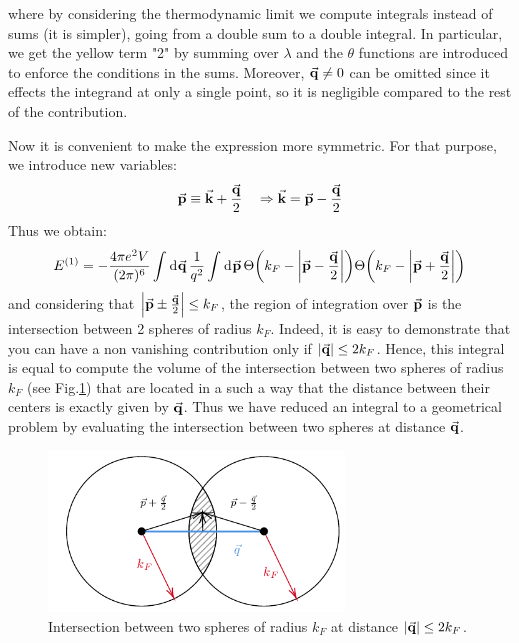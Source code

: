 \documentclass[../main/main.tex]{subfiles}
\begin{document}
where by considering the thermodynamic limit we compute integrals instead of sums (it is simpler), going from a double sum to a double integral. In particular, we get the yellow term "2" by summing over \( \lambda  \) and  the \( \theta  \) functions are introduced to enforce the conditions in the sums. Moreover, \( \va{q} \neq 0 \) can be omitted since it effects the integrand at only a single point, so it is negligible compared to the rest of the contribution.

Now it is convenient to make the expression more symmetric. For that purpose, we introduce new variables:
\begin{equation*}
  \va{p} \equiv \va{k} + \frac{\va{q}}{2} \quad \Rightarrow \va{k} = \va{p}-\frac{\va{q}}{2}
\end{equation*}
Thus we obtain:
\begin{equation*}
  E^{(1)} = - \frac{4 \pi e^2 V}{(2 \pi )^6}
  \int_{}^{} \dd[]{\va{q}} \frac{1}{q^2}
  \int_{}^{} \dd[]{\va{p}} \Theta \qty(k_F - \abs{\va{p}-\frac{\va{q}}{2}} )
  \Theta \qty(k_F - \abs{\va{p}+ \frac{\va{q}}{2}} )
\end{equation*}
and considering that \( \abs{\va{p}\pm \frac{\va{q}}{2}} \le k_F \), the region of integration over \( \va{p} \) is the intersection between 2 spheres of radius \( k_F \). Indeed, it is easy to demonstrate that you can have a non vanishing contribution only if \( \abs{\va{q}}\le 2 k_F  \).
Hence, this integral is equal to compute the volume of the intersection between two spheres of radius \( k_F \) (see Fig.\ref{fig:6_2}) that are located in a such a way that the distance between their centers is exactly given by \( \va{q} \). Thus we have reduced an integral to a geometrical problem by evaluating the intersection between two spheres at distance \( \va{q} \).

\begin{figure}[h!]
\centering
\includegraphics[width=0.7\textwidth]{../lessons/6_image/2.pdf}
\caption{\label{fig:6_2} Intersection between two spheres of radius \( k_F \) at distance \( \abs{\va{q}}  \le 2 k_F\).}
\end{figure}
\end{document}

